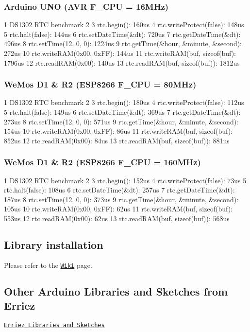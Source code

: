 \subsubsection*{Arduino U\+NO (A\+VR F\+\_\+\+C\+PU = 16\+M\+Hz)}


\begin{DoxyCode}
1 DS1302 RTC benchmark
2 
3 rtc.begin(): 160us
4 rtc.writeProtect(false): 148us
5 rtc.halt(false): 144us
6 rtc.setDateTime(&dt): 720us
7 rtc.getDateTime(&dt): 496us
8 rtc.setTime(12, 0, 0): 1224us
9 rtc.getTime(&hour, &minute, &second): 272us
10 rtc.writeRAM(0x00, 0xFF): 144us
11 rtc.writeRAM(buf, sizeof(buf): 1796us
12 rtc.readRAM(0x00): 140us
13 rtc.readRAM(buf, sizeof(buf)): 1812us
\end{DoxyCode}


\subsubsection*{We\+Mos D1 \& R2 (E\+S\+P8266 F\+\_\+\+C\+PU = 80\+M\+Hz)}


\begin{DoxyCode}
1 DS1302 RTC benchmark
2 
3 rtc.begin(): 180us
4 rtc.writeProtect(false): 112us
5 rtc.halt(false): 149us
6 rtc.setDateTime(&dt): 369us
7 rtc.getDateTime(&dt): 273us
8 rtc.setTime(12, 0, 0): 571us
9 rtc.getTime(&hour, &minute, &second): 154us
10 rtc.writeRAM(0x00, 0xFF): 86us
11 rtc.writeRAM(buf, sizeof(buf): 852us
12 rtc.readRAM(0x00): 84us
13 rtc.readRAM(buf, sizeof(buf)): 881us
\end{DoxyCode}


\subsubsection*{We\+Mos D1 \& R2 (E\+S\+P8266 F\+\_\+\+C\+PU = 160\+M\+Hz)}


\begin{DoxyCode}
1 DS1302 RTC benchmark
2 
3 rtc.begin(): 152us
4 rtc.writeProtect(false): 73us
5 rtc.halt(false): 108us
6 rtc.setDateTime(&dt): 257us
7 rtc.getDateTime(&dt): 187us
8 rtc.setTime(12, 0, 0): 373us
9 rtc.getTime(&hour, &minute, &second): 105us
10 rtc.writeRAM(0x00, 0xFF): 62us
11 rtc.writeRAM(buf, sizeof(buf): 553us
12 rtc.readRAM(0x00): 62us
13 rtc.readRAM(buf, sizeof(buf)): 568us
\end{DoxyCode}


\subsection*{Library installation}

Please refer to the \href{https://github.com/Erriez/ErriezArduinoLibrariesAndSketches/wiki}{\tt Wiki} page.

\subsection*{Other Arduino Libraries and Sketches from Erriez}


\begin{DoxyItemize}
\item \href{https://github.com/Erriez/ErriezArduinoLibrariesAndSketches}{\tt Erriez Libraries and Sketches} 
\end{DoxyItemize}